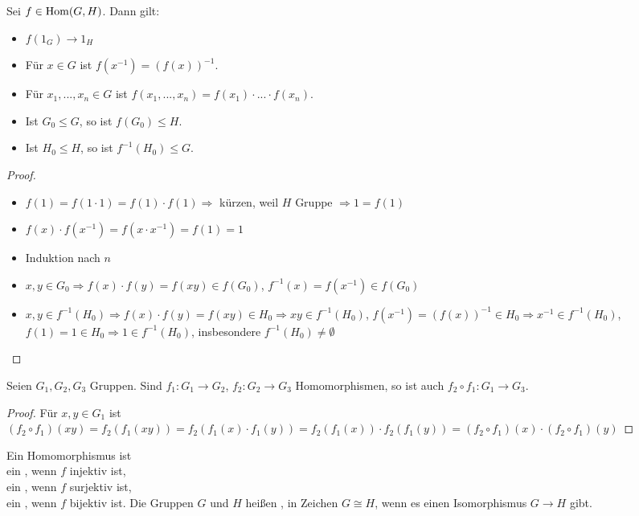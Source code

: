 \begin{proposition}
	Sei $f\in \operatorname{Hom}(G,H)$. Dann gilt: 
	\begin{itemize}
		\item $f(1_G)\to 1_H$
		\item Für $x\in G$ ist $f(x^{-1})=(f(x))^{-1}$.
		\item Für $x_1,...,x_n\in G$ ist $f(x_1,...,x_n)=f(x_1)\cdot ... \cdot f(x_n)$.
		\item Ist $G_0\le G$, so ist $f(G_0)\le H$.
		\item Ist $H_0\le H$, so ist $f^{-1}(H_0)\le G$.
	\end{itemize}
\end{proposition}
\begin{proof}
	\begin{itemize}
		\item $f(1)=f(1\cdot 1)=f(1)\cdot f(1) \Rightarrow$ kürzen, weil $H$ Gruppe $\Rightarrow 1=f(1)$
		\item $f(x)\cdot f(x^{-1})=f(x\cdot x^{-1})=f(1)=1$
		\item Induktion nach $n$
		\item $x,y\in G_0\Rightarrow f(x)\cdot f(y)=f(xy)\in f(G_0)$, $f^{-1}(x)=f(x^{-1})\in f(G_0)$
		\item $x,y\in f^{-1}(H_0)\Rightarrow f(x)\cdot f(y)=f(xy)\in H_0\Rightarrow xy\in f^{-1}(H_0)$, $f(x^{-1})=(f(x))
		^{-1}\in H_0\Rightarrow x^{-1}\in f^{-1}(H_0)$, $f(1)=1\in H_0\Rightarrow 1\in f^{-1}(H_0)$, insbesondere 
		$f^{-1}(H_0)\neq \emptyset$
	\end{itemize}
\end{proof}

\begin{proposition}
	Seien $G_1,G_2,G_3$ Gruppen. Sind $f_1:G_1\to G_2$, $f_2:G_2\to G_3$ Homomorphismen, so ist auch 
	$f_2\circ f_1:G_1\to G_3$.
\end{proposition}
\begin{proof}
	Für $x,y\in G_1$ ist $(f_2\circ f_1)(xy)=f_2(f_1(xy))=f_2(f_1(x)\cdot f_1(y))=f_2(f_1(x))\cdot f_2(f_1(y))=(f_2
	\circ f_1)(x)\cdot (f_2\circ f_1)(y)$
\end{proof}

\begin{definition}
	Ein Homomorphismus ist \\
	ein , wenn $f$ injektiv ist, \\
	ein , wenn $f$ surjektiv ist, \\
	ein , wenn $f$ bijektiv ist. Die Gruppen $G$ und $H$ heißen , in Zeichen $G\cong H$, wenn 
	es einen Isomorphismus $G\to H$ gibt.
\end{definition}

